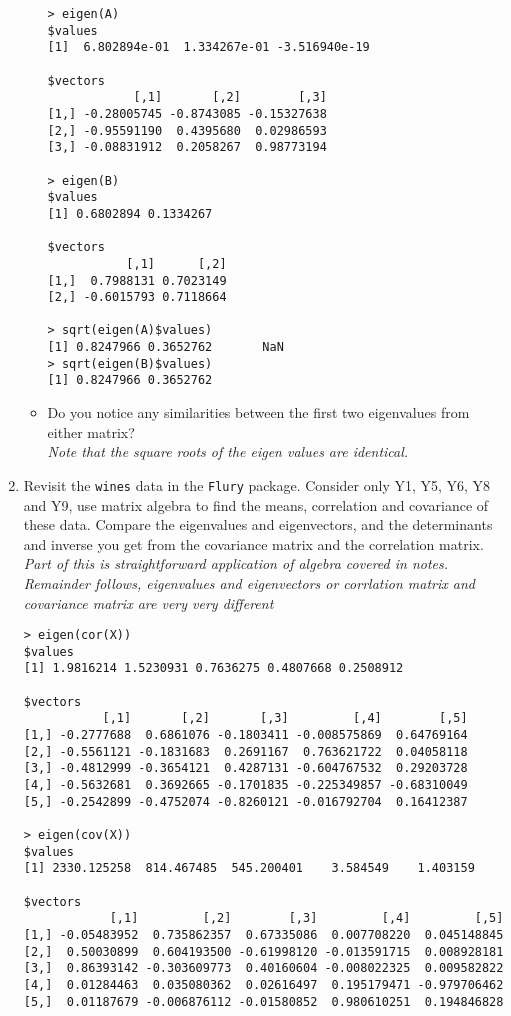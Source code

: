 \documentclass{article}
\begin{document}
\begin{enumerate}
\begin{itemize}
\begin{verbatim}
> eigen(A)
$values
[1]  6.802894e-01  1.334267e-01 -3.516940e-19

$vectors
            [,1]       [,2]        [,3]
[1,] -0.28005745 -0.8743085 -0.15327638
[2,] -0.95591190  0.4395680  0.02986593
[3,] -0.08831912  0.2058267  0.98773194

> eigen(B)
$values
[1] 0.6802894 0.1334267

$vectors
           [,1]      [,2]
[1,]  0.7988131 0.7023149
[2,] -0.6015793 0.7118664

> sqrt(eigen(A)$values)
[1] 0.8247966 0.3652762       NaN
> sqrt(eigen(B)$values)
[1] 0.8247966 0.3652762
\end{verbatim}

\item Do you notice any similarities between the first two eigenvalues from either matrix?\\
\textit{Note that the square roots of the eigen values are identical.}
\end{itemize}

\item Revisit the \texttt{wines} data in the \texttt{Flury} package.   Consider only Y1, Y5, Y6, Y8 and Y9, use matrix algebra to find the means, correlation and covariance of these data.   Compare the eigenvalues and eigenvectors, and the determinants and inverse you get from the covariance matrix and the correlation matrix.\\


\textit{Part of this is straightforward application of algebra covered in notes.   Remainder follows, eigenvalues and eigenvectors or corrlation matrix and covariance matrix are very very different}

\begin{verbatim}
> eigen(cor(X))
$values
[1] 1.9816214 1.5230931 0.7636275 0.4807668 0.2508912

$vectors
           [,1]       [,2]       [,3]         [,4]        [,5]
[1,] -0.2777688  0.6861076 -0.1803411 -0.008575869  0.64769164
[2,] -0.5561121 -0.1831683  0.2691167  0.763621722  0.04058118
[3,] -0.4812999 -0.3654121  0.4287131 -0.604767532  0.29203728
[4,] -0.5632681  0.3692665 -0.1701835 -0.225349857 -0.68310049
[5,] -0.2542899 -0.4752074 -0.8260121 -0.016792704  0.16412387

> eigen(cov(X))
$values
[1] 2330.125258  814.467485  545.200401    3.584549    1.403159

$vectors
            [,1]         [,2]        [,3]         [,4]         [,5]
[1,] -0.05483952  0.735862357  0.67335086  0.007708220  0.045148845
[2,]  0.50030899  0.604193500 -0.61998120 -0.013591715  0.008928181
[3,]  0.86393142 -0.303609773  0.40160604 -0.008022325  0.009582822
[4,]  0.01284463  0.035080362  0.02616497  0.195179471 -0.979706462
[5,]  0.01187679 -0.006876112 -0.01580852  0.980610251  0.194846828
\end{verbatim}

\end{enumerate} 
\end{document}
